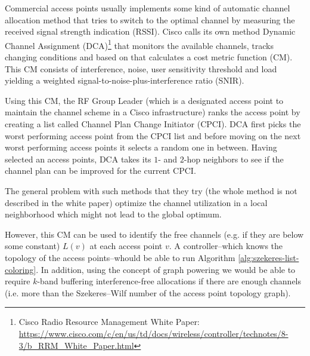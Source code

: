 \documentclass[a4paper, 12pt]{article}
\begin{document}
Commercial access points usually implements some kind of automatic channel allocation method that tries to switch to the optimal channel by measuring the received signal strength indication (RSSI). Cisco calls its own method Dynamic Channel Assignment (DCA)\footnote{Cisco Radio Resource Management White Paper: \url{https://www.cisco.com/c/en/us/td/docs/wireless/controller/technotes/8-3/b_RRM_White_Paper.html}} that monitors the available channels, tracks changing conditions and based on that calculates a cost metric function (CM). This CM consists of interference, noise, user sensitivity threshold and load yielding a weighted signal-to-noise-plus-interference ratio (SNIR).

Using this CM, the RF Group Leader (which is a designated access point to maintain the channel scheme in a Cisco infrastructure) ranks the access point by creating a list called Channel Plan Change Initiator (CPCI). DCA first picks the worst performing access point from the CPCI list and before moving on the next worst performing access points it selects a random one in between. Having selected an access points, DCA takes its $1$- and $2$-hop neighbors to see if the channel plan can be improved for the current CPCI.

The general problem with such methods that they try (the whole method is not described in the white paper) optimize the channel utilization in a local neighborhood which might not lead to the global optimum.

However, this CM can be used to identify the free channels (e.g. if they are below some constant) $L(v)$ at each access point $v$. A controller\---which knows the topology of the access points\---whould be able to run Algorithm \ref{alg:szekeres-list-coloring}. In addition, using the concept of graph powering we would be able to require $k$-band buffering interference-free allocations if there are enough channels (i.e. more than the Szekeres\---Wilf number of the access point topology graph).
\end{document}
